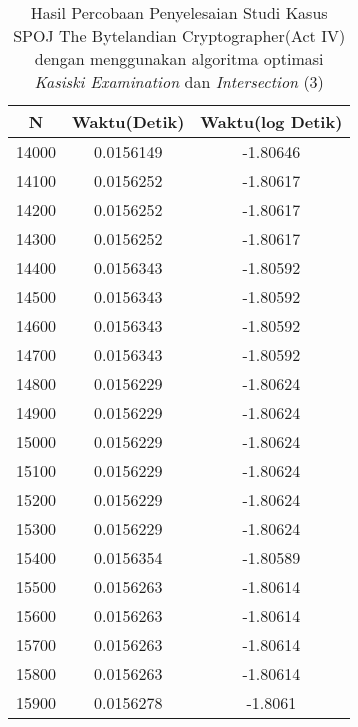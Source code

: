 \begin{table}[H]
\centering
\caption {Hasil Percobaan Penyelesaian Studi Kasus SPOJ The Bytelandian Cryptographer(Act IV) dengan menggunakan algoritma optimasi \textit{Kasiski Examination} dan \textit{Intersection} (3)}
\begin{tabular}{|c|c|c|}\hline
N&Waktu(Detik)&Waktu(log Detik)\\ \hline
14000&0.0156149&-1.80646\\ \hline
14100&0.0156252&-1.80617\\ \hline
14200&0.0156252&-1.80617\\ \hline
14300&0.0156252&-1.80617\\ \hline
14400&0.0156343&-1.80592\\ \hline
14500&0.0156343&-1.80592\\ \hline
14600&0.0156343&-1.80592\\ \hline
14700&0.0156343&-1.80592\\ \hline
14800&0.0156229&-1.80624\\ \hline
14900&0.0156229&-1.80624\\ \hline
15000&0.0156229&-1.80624\\ \hline
15100&0.0156229&-1.80624\\ \hline
15200&0.0156229&-1.80624\\ \hline
15300&0.0156229&-1.80624\\ \hline
15400&0.0156354&-1.80589\\ \hline
15500&0.0156263&-1.80614\\ \hline
15600&0.0156263&-1.80614\\ \hline
15700&0.0156263&-1.80614\\ \hline
15800&0.0156263&-1.80614\\ \hline
15900&0.0156278&-1.8061\\ \hline
\end{tabular}
\label{tab:res7}
\end{table}
